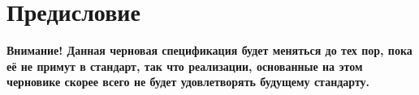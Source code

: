 \ifrelease
\else
    \chapter{Предисловие}

    {\bf Внимание! Данная черновая спецификация будет меняться до тех пор, пока её не
    примут в стандарт, так что реализации, основанные на этом черновике скорее всего не
    будет удовлетворять будущему стандарту.}
\fi
